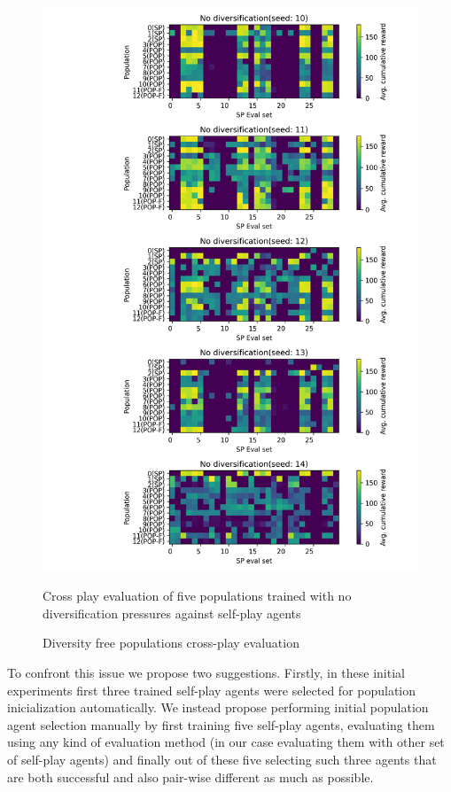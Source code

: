 \begin{figure}[!ht]
    \centering
    \includegraphics*[width=14cm]{../img/Forced_coordination_CNN_POP_NO_DIF(2).png}

    \caption{Diversity free populations cross-play evaluation}
    \label{CNNPopNoDiffBestInitFixation}
    \medskip
    \small 
    Cross play evaluation of five populations trained with no diversification pressures against self-play agents

\end{figure}

To confront this issue we propose two suggestions.
Firstly, in these initial experiments first three trained self-play agents were selected for population inicialization automatically.
We instead propose performing initial population agent selection manually by first training five self-play agents, evaluating them using any kind of evaluation method (in our case evaluating them with other set of self-play agents) and finally out of these five selecting such three agents that are both successful and also pair-wise different as much as possible.

